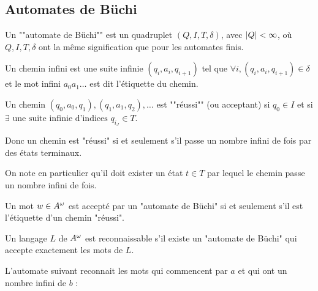 \subsection{Automates de Büchi}

\begin{definition}
	Un ""automate de Büchi"" est un quadruplet $(Q,I,T,\delta)$, avec $\left|Q\right| < \infty$, où
	$Q,I,T,\delta$ ont la même signification que pour les automates finis.
\end{definition}

\begin{definition}
	Un chemin infini est une suite infinie $(q_i,a_i,q_{i+1})$ tel que $\forall i, (q_i,a_i,q_{i+1}) \in \delta$ et le mot
	infini $a_0a_1\ldots$ est dit l'étiquette du chemin.
\end{definition}


\begin{definition}
	Un chemin $(q_0, a_0, q_1), (q_1, a_1, q_2), \ldots $ est ""réussi"" (ou acceptant) si $q_0 \in I$ et si $\exists \text{ une suite infinie d'indices } q_{i_J} \in T$.

	Donc un chemin est "réussi" si et seulement s'il passe un nombre infini de fois par des états terminaux.

	On note en particulier qu'il doit exister un état $t \in T$ par lequel le chemin passe un nombre infini de fois.
\end{definition}

\begin{definition}
	Un mot $w \in A^{\omega}$ est accepté par un "automate de Büchi" si et seulement s'il est l'étiquette d'un chemin "réussi".
\end{definition}


\begin{definition}
	Un langage $L$ de $A^{\omega}$ est reconnaissable s'il existe un "automate de Büchi" qui accepte exactement les mots de $L$.
\end{definition}


\begin{exemple}
	L'automate suivant reconnait les mots qui commencent par $a$ et qui ont un nombre infini de $b$ :

	\begin{automata}
	\end{automata}
\end{exemple}



